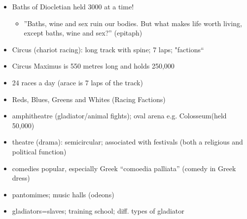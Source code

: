 \documentclass[12pt, twoside]{article}
\begin{document}
\begin{itemize}
\item Baths of Diocletian held 3000 at a time!
	\begin{itemize}
	\item ”Baths, wine and sex ruin our bodies. But what makes life worth living, except baths, wine and sex?” (epitaph)
	\end{itemize}
\item Circus (chariot racing): long track with spine; 7 laps; "factions“
\item Circus Maximus is 550 metres long and holds 250,000
\item 24 races a day (arace is 7 laps of the track)
\item Reds, Blues, Greens and Whites (Racing Factions)
\item amphitheatre (gladiator/animal fights); oval arena e.g. Colosseum(held 50,000)
\item theatre (drama): semicircular; associated with festivals (both a religious and political function)
\item comedies popular, especially Greek “comoedia palliata” (comedy in Greek dress)
\item pantomimes; music halls (odeons)
\item gladiators=slaves; training school; diff. types of gladiator
\end{itemize}
\end{document}
